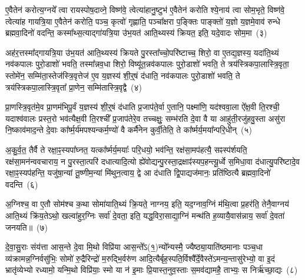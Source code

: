 ए॒वैतेन॑ करोत्य॒ग्नये᳚ त्वा रायस्पोष॒दाव्ने॒ विष्ण॑वे॒ त्वेत्या॑हानु॒ष्टुभ॑ ए॒वैतेन॑ करोति श्ये॒नाय॑ त्वा सोम॒भृते॒ विष्ण॑वे॒ त्वेत्या॑ह गायत्रि॒या ए॒वैतेन॑ करोति॒ पञ्च॒ कृत्वो॑ गृह्णाति॒ पञ्चा᳚क्षरा प॒ङ्क्तिः पाङ्क्तो॑ य॒ज्ञो य॒ज्ञमे॒वाव॑ रुन्धे ब्रह्मवा॒दिनो॑ वदन्ति॒ कस्मा᳚थ्स॒त्याद्गा॑यत्रि॒या उ॑भ॒यत॑ आति॒थ्यस्य॑ क्रियत॒ इति॒ यदे॒वादः सोम॒मा~(३)\ip

अह॑र॒त्तस्मा᳚द्\-गायत्रि॒या उ॑भ॒यत॑ आति॒थ्यस्य॑ क्रियते पु॒रस्ता᳚च्चो॒परि॑ष्टाच्च॒ शिरो॒ वा ए॒तद्य॒ज्ञस्य॒ यदा॑ति॒थ्यं नव॑कपालः पुरो॒डाशो॑ भवति॒ तस्मा᳚न्नव॒धा शिरो॒ विष्यू॑त॒न्नव॑कपालः पुरो॒डाशो॑ भवति॒ ते त्रय॑स्त्रिकपा॒लास्त्रि॒वृता॒ स्तोमे॑न॒ सम्मि॑ता॒स्तेज॑स्त्रि॒वृत्तेज॑ ए॒व य॒ज्ञस्य॑ शी॒र्॒\mbox{}षं द॑धाति॒ नव॑कपालः पुरो॒डाशो॑ भवति॒ ते त्रय॑स्त्रिकपा॒लास्त्रि॒वृता᳚ प्रा॒णेन॒ सम्मि॑तास्त्रि॒वृद्वै~(४)\ip

प्रा॒णस्त्रि॒वृत॑मे॒व प्रा॒णम॑भिपू॒र्वं य॒ज्ञस्य॑ शी॒र्॒\mbox{}षं द॑धाति प्र॒जा\-प॑ते॒र्वा ए॒तानि॒ पक्ष्मा॑णि॒ यद॑श्ववा॒ला ऐ᳚क्ष॒वी ति॒रश्ची॒ यदाश्व॑वालः प्रस्त॒रो भव॑त्यैक्ष॒वी ति॒रश्ची᳚ प्र॒जा\-प॑तेरे॒व तच्चक्षुः॒ सम्भ॑रति दे॒वा वै या आहु॑ती॒रजु॑हवु॒स्ता असु॑रा नि॒ष्काव॑माद॒न्ते दे॒वाः का᳚र्\mbox{}ष्म॒र्य॑मपश्यन्कर्म॒ण्यो॑ वै कर्मै॑नेन कुर्वी॒तेति॒ ते का᳚र्ष्मर्य॒मया᳚न्परि॒धीन्~(५)\ip

अ॒कु॒र्व॒त॒ तैर्वै ते रक्षा॒ꣴ॒स्यपा᳚घ्नत॒ यत्का᳚र्ष्मर्य॒मयाः᳚ परि॒धयो॒ भव॑न्ति॒ रक्ष॑सा॒मप॑हत्यै॒ सꣴस्प॑र्\mbox{}शयति॒ रक्ष॑सा॒मन॑न्ववचाराय॒ न पु॒रस्ता॒त्परि॑ दधात्यादि॒त्यो ह्ये॑वोद्यन्\-पु॒रस्ता॒द्\-रक्षाꣴ॑स्यप॒हन्त्यू॒र्ध्वे स॒मिधा॒वा द॑धात्यु॒परि॑ष्टादे॒व रक्षा॒ꣴ॒स्यप॑हन्ति॒ यजु॑षा॒न्यां तू॒ष्णीम॒न्यां मि॑थुन॒त्वाय॒ द्वे आ द॑धाति द्वि॒पाद्यज॑मानः॒ प्रति॑ष्ठित्यै ब्रह्मवा॒दिनो॑ वदन्ति~(६)\ip

अ॒ग्निश्च॒ वा ए॒तौ सोम॑श्च क॒था सोमा॑याति॒थ्यं क्रि॒यते॒ नाग्नय॒ इति॒ यद॒ग्नाव॒ग्निं म॑थि॒त्वा प्र॒हर॑ति॒ तेनै॒वाग्नय॑ आति॒थ्यं क्रि॑य॒ते\-ऽथो॒ खल्वा॑हुर॒ग्निः सर्वा॑ दे॒वता॒ इति॒ यद्ध॒विरा॒साद्या॒ग्निं मन्थ॑ति ह॒व्यायै॒वास॑न्नाय॒ सर्वा॑ दे॒वता॑ जनयति॥~(७)\ip

{\anuvakamend[{पत्नि॑या ए॒व जग॑त्या॒ आ त्रि॒वृद्वै प॑रि॒धीन् व॑द॒न्त्येक॑चत्वारिꣳशच्च}]}

दे॒वा॒सु॒राः संय॑त्ता आस॒न्ते दे॒वा मि॒थो विप्रि॑या आस॒न्ते᳚\-ऽ(१॒)न्यो᳚न्यस्मै॒ ज्यैष्ठ्या॒याति॑ष्ठमानाः पञ्च॒धा व्य॑क्रामन्न॒ग्नि\-र्वसु॑भिः॒ सोमो॑ रु॒द्रैरिन्द्रो॑ म॒रुद्भि॒र्वरु॑ण आदि॒त्यैर्बृह॒स्पति॒र्विश्वै᳚र्दे॒वैस्ते॑\-ऽमन्य॒न्तासु॑रेभ्यो॒ वा इ॒दं भ्रातृ॑व्येभ्यो रध्यामो॒ यन्मि॒थो विप्रि॑याः॒ स्मो या न॑ इ॒माः प्रि॒यास्त॒नुव॒स्ताः स॒मव॑द्यामहै॒ ताभ्यः॒ स निर्\mbox{}ऋ॑च्छा॒द्यः~(८)\ip

